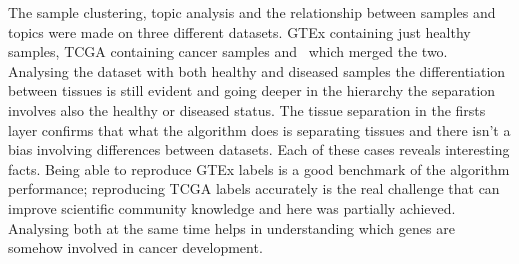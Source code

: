 The sample clustering, topic analysis and the relationship between samples and topics were made on three different datasets. GTEx containing just healthy samples, TCGA containing cancer samples and~\cite{Wang2017} which merged the two. Analysing the dataset with both healthy and diseased samples the differentiation between tissues is still evident and going deeper in the hierarchy the separation involves also the healthy or diseased status. The tissue separation in the firsts layer confirms that what the algorithm does is separating tissues and there isn't a bias involving differences between datasets.
\clearpage
Each of these cases reveals interesting facts. Being able to reproduce GTEx labels is a good benchmark of the algorithm performance; reproducing TCGA labels accurately is the real challenge that can improve scientific community knowledge and here was partially achieved. Analysing both at the same time helps in understanding which genes are somehow involved in cancer development.
